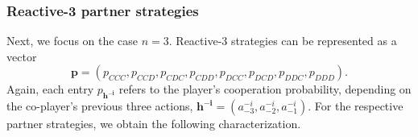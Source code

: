 \documentclass[9pt,twoside,lineno]{pnas-new}
\theoremstyle{plainCl1}
\newtheorem{corollary}{Corollary}
\theoremstyle{plainCl2}
\begin{document}


\subsubsection*{Reactive-3 partner strategies}
Next, we focus on the case $n\!=\!3$. Reactive-3 strategies can be represented as a vector 
$$\mathbf{p}=(p_{CCC}, p_{CCD}, p_{CDC}, p_{CDD}, p_{DCC}, p_{DCD}, p_{DDC}, p_{DDD}).$$
Again, each entry $p_\mathbf{h^{-i}}$ refers to the player's cooperation probability, depending on the co-player's previous three actions, $\mathbf{h^{-i}}\!=\!(a^{-i}_{-3}, a^{-i}_{-2}, a^{-i}_{-1})$.
For the respective partner strategies, we obtain the following characterization. 
\end{document}
